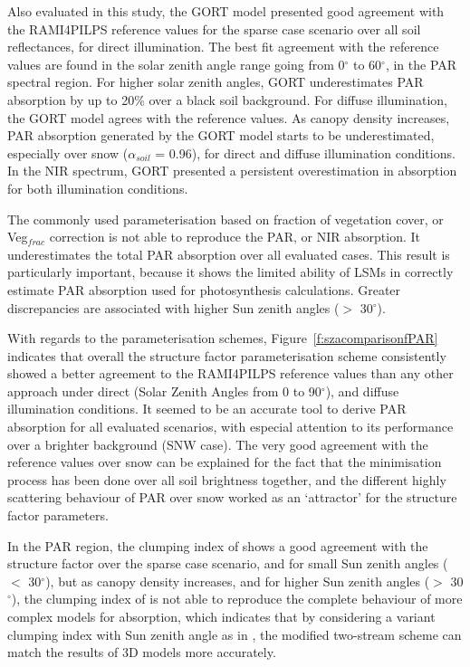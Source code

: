 Also evaluated in this study, the GORT model presented good agreement with the RAMI4PILPS reference values for the sparse case scenario over all soil reflectances, for direct illumination. The best fit agreement with the reference values are found in the solar zenith angle range going from 0$^{\circ}$ to 60$^{\circ}$, in the PAR spectral region. For higher solar zenith angles, GORT underestimates PAR absorption by up to 20\% over a black soil background. For diffuse illumination, the GORT model agrees with the reference values. As canopy density increases, PAR absorption generated by the GORT model starts to be underestimated, especially over snow ($\alpha_{soil}$ = 0.96), for direct and diffuse illumination conditions. In the NIR spectrum, GORT presented a persistent overestimation in absorption for both illumination conditions.

The commonly used parameterisation based on fraction of vegetation cover, or Veg$_{frac}$ correction is not able to reproduce the PAR, or NIR absorption. It underestimates the total PAR absorption over all evaluated cases. This result is particularly important, because it shows the limited ability of LSMs in correctly estimate PAR absorption used for photosynthesis calculations. Greater discrepancies are associated with higher Sun zenith angles ($>$ 30$^{\circ}$).

With regards to the parameterisation schemes, Figure~\ref{f:szacomparisonfPAR} indicates that overall the structure factor parameterisation scheme \citep{pinty2006} consistently showed a better agreement to the RAMI4PILPS reference values than any other approach under direct (Solar Zenith Angles from 0 to 90$^{\circ}$), and diffuse illumination conditions. It seemed to be an accurate tool to derive PAR absorption for all evaluated scenarios, with especial attention to its performance over a brighter background (SNW case). The very good agreement with the reference values over snow can be explained for the fact that the minimisation process has been done over all soil brightness together, and the different highly scattering behaviour of PAR over snow worked as an `attractor' for the structure factor parameters.

In the PAR region, the clumping index of \citet{Nilson1971} shows a good agreement with the structure factor over the sparse case scenario, and for small Sun zenith angles ($<$ 30$^{\circ}$), but as canopy density increases, and for higher Sun zenith angles ($>$ 30$^{\circ}$), the clumping index of \citet{Nilson1971} is not able to reproduce the complete behaviour of more complex models for absorption, which indicates that by considering a variant clumping index with Sun zenith angle as in \citet{pinty2006}, the modified two-stream scheme can match the results of 3D models more accurately. 

